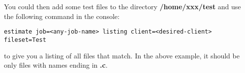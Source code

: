 You could then add some test files to the directory {\bf /home/xxx/test}
and use the following command in the console:

\footnotesize
\begin{verbatim}
estimate job=<any-job-name> listing client=<desired-client> fileset=Test
\end{verbatim}
\normalsize

to give you a listing of all files that match.  In the above
example, it should be only files with names ending in  {\bf .c}.
